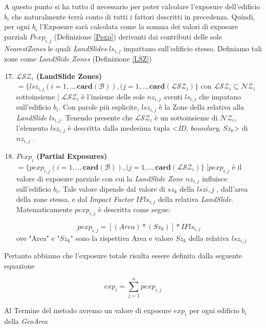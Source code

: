A questo punto si ha tutto il necessario per poter calcolare l'exposure dell'edificio $b_i$ che naturalmente terrà conto di tutti i fattori descritti in precedenza. Quindi, per ogni $b_i$ l'Exposure sarà calcolata come la somma dei valori di exposure parziali $Pexp_{i,j}$ (Definizione \ref{Pexp}) derivanti dai contributi delle sole \textit{NearestZones} le quali \textit{LandSlides} $ls_{i,j}$ impattano sull'edificio stesso.
Definiamo tali zone come \textit{LandSlide Zones} (Definizione \ref{LSZ})

\begin{enumerate}
	\setcounter{enumi}{16}

	\item \label{LSZ} \textbf{$ \mathcal{LSZ}_i $ (LandSlide Zones)} $ = \{lsz_{i,j}(i=1,..,\mathbf{card}(\mathcal{B})),(j=1,..,\mathbf{card}(\mathcal{LSZ}_i)\}$ con $\mathcal{LSZ}_i \subseteq \mathcal{NZ}_i$  sottoinsieme | $\mathcal{LSZ}_i$ 
	è l'insieme delle sole $nz_{i,j}$ aventi $ls_{i,j}$ che impatano sull'edificio $b_i$. 
	Con parole più esplicite, $lsz_{i,j}$ è la Zone della relativa alla \textit{LandSlide} $ls_{i,j}$. 
	Tenendo presente che $\mathcal{LSZ}_i$ è un sottoinsieme di $\mathcal{NZ}_i$, l'elemento $lsz_{i,j}$  è descritta dalla medesima tupla <\textit{ID}, \textit{boundary}, \textit{$Sz_k$}> di $nz_{i,j}$ . 
	
	\item \label{Pexp} $Pexp_i$ \textbf{(Partial Exposures)} $ = \{pexp_{i,j}(i=1,..,\mathbf{card}(\mathcal{B})),(j=1,..,\mathbf{card}(\mathcal{LSZ}_i)\}$ |$pexp_{i,j}$ è il valore di exposure parziale con cui la \textit{LandSlide Zone} $nz_{i,j}$ influisce sull'edificio $b_i$. Tale valore dipende dal valore di $sz_k$ della $lsz{i,j}$ , dall'area della zone stessa, e dal \textit{Impact Factor} $IFls_{i,j}$ della relativa \textit{LandSlide}. Matematicamente $pexp_{i,j}$ è descritta come segue:
	
	\begin{equation}\label{eq:exposure2}
	pexp_{i,j} =[(Area)*(Sz_{k})] * IFls_{i,j}
	\end{equation}
	ove "Area" e "$Sz_k$" sono la rispettiva Area e valore $Sz_k$ della relativa $lsz_{i,j}$ 
	
\end{enumerate}

Pertanto abbiamo che l'exposure totale risulta essere definita dalla seguente equazione

\begin{equation}\label{eq:exposure1}
exp_i =\sum_{j=1}^n pexp_{i,j}
\end{equation}

Al Termine del metodo avremo un valore di exposure $exp_i$ per ogni edificio $b_i$ della \textit{GeoArea}






